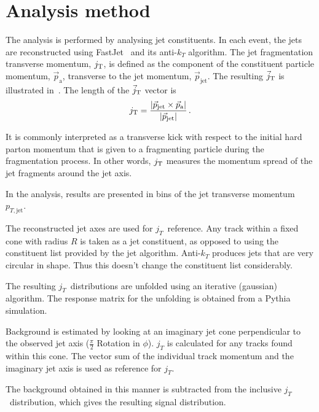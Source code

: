 \section{Analysis method}
\label{sec:methods}

The analysis is performed by analysing jet constituents. In each event, the jets are reconstructed using FastJet~\cite{fastjet} and its anti-$k_T$ algorithm. The jet fragmentation transverse momentum, $j_{\rm T}$, is defined as the component of the constituent particle momentum, $\vec{p}_{\mathrm{a}}$, transverse to the jet momentum, $\vec{p}_{\mathrm{jet}}$. The resulting $\vec{j}_{\rm T}$ is illustrated in~. The length of the $\vec{j}_{\rm T}$ vector is
  \begin{equation}
    j_{\rm T} = \frac{|\vec{p}_{\mathrm{jet}} \times \vec{p}_{\mathrm{a}}|}{|\vec{p}_{\mathrm{jet}}|} \,.
  \label{eq:jtdefinition}
  \end{equation}

It is commonly interpreted as a transverse kick with respect to the initial hard parton momentum that is given to a fragmenting particle during the fragmentation process. In other words, $j_{\rm T}$ measures the momentum spread of the jet fragments around the jet axis. 

In the analysis, results are presented in bins of the jet transverse momentum $p_{T,\mathrm{jet}}$.

The reconstructed jet axes are used for $j_T$ reference. Any track within a fixed cone with radius $R$ is taken as a jet constituent, as opposed to using the constituent list provided by the jet algorithm. Anti-$k_T$ produces jets that are very circular in shape. Thus this doesn't change the constituent list considerably. 
 
The resulting $j_T$ distributions are unfolded using an iterative (gaussian) algorithm. The response matrix for the unfolding is obtained from a Pythia~\cite{} simulation. 

 
Background is estimated by looking at an imaginary jet cone perpendicular to the observed jet axis ($\frac{\pi}{2}$ Rotation in $\phi$). $j_T$ is calculated for any tracks found within this cone. The vector sum of the individual track momentum and the imaginary jet axis is used as reference for $j_T$. 

The background obtained in this manner is subtracted from the inclusive $j_T$ distribution, which gives the resulting signal distribution.

